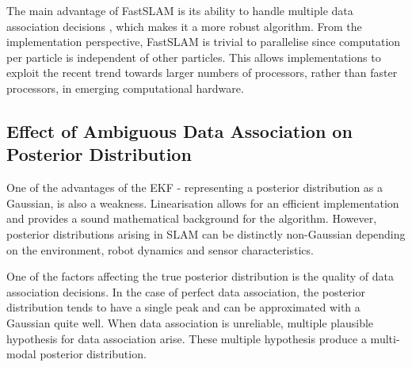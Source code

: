 The main advantage of FastSLAM is its ability to handle multiple data
association decisions \cite{Montemerlo2003}, which makes it a more
robust algorithm. From the implementation perspective, FastSLAM is
trivial to parallelise since computation per particle is independent
of other particles. This allows implementations to exploit the recent
trend towards larger numbers of processors, rather than faster
processors, in emerging computational hardware.

\subsection{Effect of Ambiguous Data Association on Posterior
  Distribution}
\label{sec:AmbiguousDA}

One of the advantages of the EKF - representing a posterior
distribution as a Gaussian, is also a weakness. Linearisation allows
for an efficient implementation and provides a sound mathematical
background for the algorithm. However, posterior distributions arising
in SLAM can be distinctly non-Gaussian depending on the environment,
robot dynamics and sensor characteristics.

One of the factors affecting the true posterior distribution is the
quality of data association decisions. In the case of perfect data
association, the posterior distribution tends to have a single peak
and can be approximated with a Gaussian quite well. When data
association is unreliable, multiple plausible hypothesis for data
association arise. These multiple hypothesis produce a multi-modal
posterior distribution.

